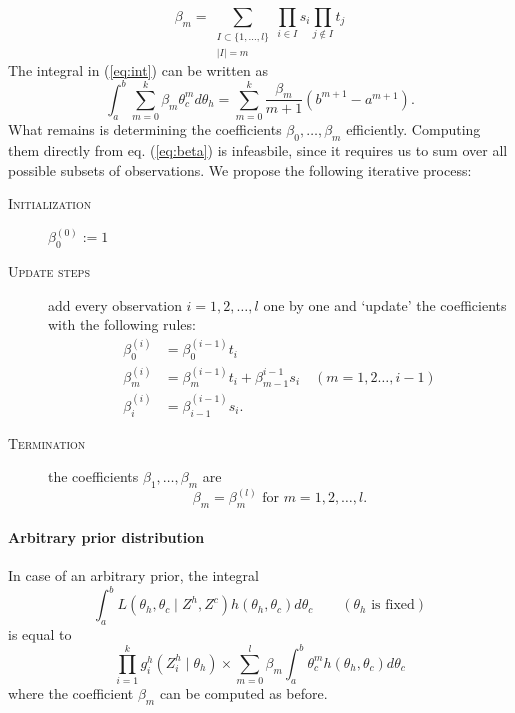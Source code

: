 \documentclass[12pt,a4paper]{article}
\numberwithin{equation}{section}
\begin{document}
\begin{equation}
 \beta_m = \sum_{\substack{
            I \subset \{1,\dots,l\}\\
            |I| = m}} \prod_{i \in I} s_i \prod_{j \not\in I} t_j
            \label{eq:beta}
\end{equation}
The integral in (\ref{eq:int}) can be written as 
\begin{equation}
 \int_a^b \sum_{m=0}^k \beta_m \theta_c^m d\theta_h = \sum_{m=0}^k \frac{\beta_m}{m+1} \left(b^{m+1}-a^{m+1}\right). 
\end{equation}
What remains is determining the coefficients $\beta_0, \dots, \beta_m$ efficiently. Computing them directly from eq. (\ref{eq:beta}) is infeasbile, since it requires us to sum over all possible subsets of observations. We propose the following iterative process: 
\begin{description}
 \item[\textsc{Initialization}] $\beta_0^{(0)} := 1$ 
 \item[\textsc{Update steps}] add every observation $i = 1,2,\dots,l$ one by one and `update' the coefficients with the following rules: 
 \begin{equation}
  \begin{aligned}
   \beta_0^{(i)} &= \beta_0^{(i-1)} t_i \\ 
   \beta_m^{(i)} &= \beta_m^{(i-1)} t_i + \beta_{m-1}^{i-1} s_i \quad (m = 1,2\dots,i-1) \\ 
   \beta_i^{(i)} &= \beta_{i-1}^{(i-1)} s_i. 
  \end{aligned}
 \end{equation}
 \item[\textsc{Termination}] the coefficients $\beta_1, \dots, \beta_m$ are 
 \begin{equation}
  \beta_m = \beta_m^{(l)} \text{ for }m = 1,2,\dots,l.
 \end{equation}


\end{description}

\paragraph{Arbitrary prior distribution} In case of an arbitrary prior, the integral 
\begin{equation}
  \int_a^b L(\theta_h, \theta_c \mid Z^h, Z^c) h(\theta_h, \theta_c) d\theta_c \qquad (\theta_h \text{ is fixed})
\end{equation}
is equal to 
\begin{equation}
 \prod_{i=1}^k g_i^h\left(Z^h_i \mid \theta_h \right) \times \sum_{m=0}^l \beta_m \int_a^b \theta_c^m h(\theta_h, \theta_c) d\theta_c
\end{equation}
where the coefficient $\beta_m$ can be computed as before. 
\end{document}
